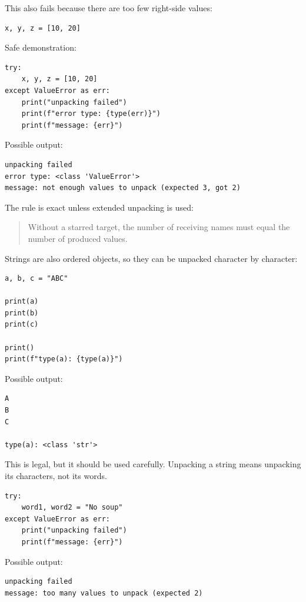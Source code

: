 This also fails because there are too few right-side values:

\begin{verbatim}
x, y, z = [10, 20]
\end{verbatim}

Safe demonstration:

\begin{verbatim}
try:
    x, y, z = [10, 20]
except ValueError as err:
    print("unpacking failed")
    print(f"error type: {type(err)}")
    print(f"message: {err}")
\end{verbatim}

Possible output:

\begin{verbatim}
unpacking failed
error type: <class 'ValueError'>
message: not enough values to unpack (expected 3, got 2)
\end{verbatim}

The rule is exact unless extended unpacking is used:

\begin{quote}
Without a starred target, the number of receiving names must equal the number of produced values.
\end{quote}

Strings are also ordered objects, so they can be unpacked character by character:

\begin{verbatim}
a, b, c = "ABC"

print(a)
print(b)
print(c)

print()
print(f"type(a): {type(a)}")
\end{verbatim}

Possible output:

\begin{verbatim}
A
B
C

type(a): <class 'str'>
\end{verbatim}

This is legal, but it should be used carefully. Unpacking a string means unpacking its characters, not its words.

\begin{verbatim}
try:
    word1, word2 = "No soup"
except ValueError as err:
    print("unpacking failed")
    print(f"message: {err}")
\end{verbatim}

Possible output:

\begin{verbatim}
unpacking failed
message: too many values to unpack (expected 2)
\end{verbatim}

